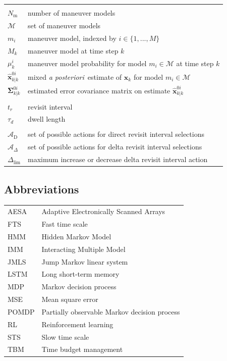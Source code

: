 \documentclass[english, 12pt, a4paper, elec, utf8, a-1b, online]{aaltothesis}
\renewcommand{\vec}[1]{\mathbf{#1}}
\newcommand{\As}{\mathcal{A}}
\newcommand{\x}{\vec{x}_k}
\newcommand{\modeprob}{\mu_k^i}
\newcommand{\xmxinitcurr}{\hat{\vec{x}}^{0i}_{k|k}}
\newcommand{\ecovmxinitcurr}{\bm{\Sigma}^{0i}_{k|k}}
\newcommand{\deltalim}{\Delta_\text{lim}}
\newcommand{\Asdir}{\As_\text{D}}
\newcommand{\Asdelta}{\As_\Delta}
\def\post{\textit{a posteriori}\ }
\newcommand{\mimm}{\mathcal{M}}
\newcommand{\nmodels}{{N_\text{m}}}
\begin{document}
\begin{longtable}{ll}
&\\
$\nmodels$ & number of maneuver models \\
$\mimm$ & set of maneuver models \\
$m_i$ & maneuver model, indexed by $i \in \{1, ..., M\}$ \\
$M_k$ & maneuver model at time step $k$ \\
$\modeprob$ & maneuver model probability for model $m_i \in \mimm$ at time step $k$ \\
$\xmxinitcurr$ & mixed \post estimate of $\x$ for model $m_i \in \mimm$\\
$\ecovmxinitcurr$ &  estimated error covariance matrix on estimate $\xmxinitcurr$\\
&\\
$t_r$ & revisit interval \\
$\tau_d$ & dwell length \\
&\\
$\Asdir$ & set of possible actions for direct revisit interval selections \\
$\Asdelta$ & set of possible actions for delta revisit interval selections \\
$\deltalim$ & maximum increase or decrease delta revisit interval action \\
\end{longtable}

\subsection*{Abbreviations}

\begin{tabular}{ll}
AESA & Adaptive Electronically Scanned Arrays \\
FTS & Fast time scale \\
HMM & Hidden Markov Model \\
IMM & Interacting Multiple Model \\
JMLS & Jump Markov linear system \\
LSTM & Long short-term memory \\
MDP & Markov decision process \\
MSE & Mean square error \\
POMDP      & Partially observable Markov decision process \\
RL & Reinforcement learning \\
STS & Slow time scale \\
TBM & Time budget management \\
\end{tabular}
\end{document}
